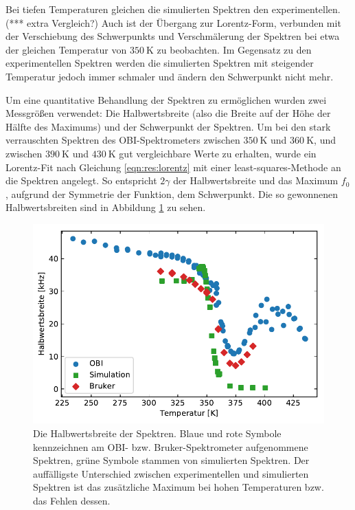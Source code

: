 Bei tiefen Temperaturen gleichen die simulierten Spektren den experimentellen. (*** extra Vergleich?) Auch ist der Übergang zur Lorentz-Form, verbunden mit der Verschiebung des Schwerpunkts und Verschmälerung der Spektren bei etwa der gleichen Temperatur von $\SI{350}{\kelvin}$ zu beobachten. Im Gegensatz zu den experimentellen Spektren werden die simulierten Spektren mit steigender Temperatur jedoch immer schmaler und ändern den Schwerpunkt nicht mehr.


Um eine quantitative Behandlung der Spektren zu ermöglichen wurden zwei Messgrößen verwendet: Die Halbwertsbreite (also die Breite auf der Höhe der Hälfte des Maximums) und der Schwerpunkt der Spektren. Um bei den stark verrauschten Spektren des OBI-Spektrometers zwischen $\SI{350}{\kelvin}$ und $\SI{360}{\kelvin}$, und zwischen $\SI{390}{\kelvin}$ und $\SI{430}{\kelvin}$ gut vergleichbare Werte zu erhalten, wurde ein Lorentz-Fit nach Gleichung \eqref{eqn:res:lorentz} mit einer least-squares-Methode an die Spektren angelegt. So entspricht $2 \gamma$ der Halbwertsbreite und das Maximum $f_0$, aufgrund der Symmetrie der Funktion, dem Schwerpunkt. Die so gewonnenen Halbwertsbreiten sind in Abbildung \ref{fig:res:spek_fwhm} zu sehen.
\begin{figure}
	\begin{center}
		\includegraphics[width=.9\textwidth]{graphics/plot/fwhm.pdf}
	\end{center}
	\caption{Die Halbwertsbreite der Spektren. Blaue und rote Symbole kennzeichnen am OBI- bzw. Bruker-Spektrometer aufgenommene Spektren, grüne Symbole stammen von simulierten Spektren. Der auffälligste Unterschied zwischen experimentellen und simulierten Spektren ist das zusätzliche Maximum bei hohen Temperaturen bzw. das Fehlen dessen.} \label{fig:res:spek_fwhm}
\end{figure}

